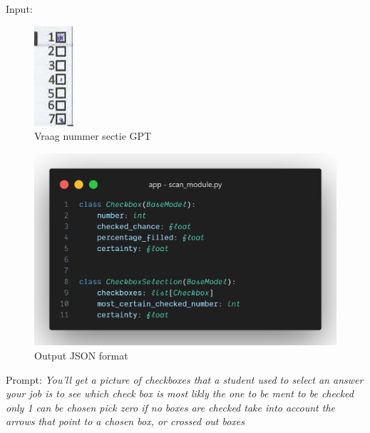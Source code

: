 \documentclass[12pt]{article}
\begin{document}
\begin{multicols}{2}
Input: 
\begin{figure}[H]
    \centering
    \includegraphics[width=0.33\linewidth]{./images/methoden/inscannen/sectie/checkbox/vraagnummer/section_selection_input.png}
    \caption{Vraag nummer sectie GPT}
    \label{fig:enter-label}
\end{figure}
\begin{figure}[H]
    \centering
    \includegraphics[width=1\linewidth]{./images/methoden/inscannen/sectie/checkbox/vraagnummer/code-question-selector-format.png}
    \caption{Output JSON format}
    \label{fig:enter-label}
\end{figure}

Prompt:
\parindent \textit{You'll get a picture of checkboxes that a student used to select an answer
    your job is to see which check box is most likly the one to be ment to be checked
    only 1 can be chosen
    pick zero if no boxes are checked 
    take into account the arrows that point to a chosen box, or crossed out boxes}


\end{multicols}
\end{document}
